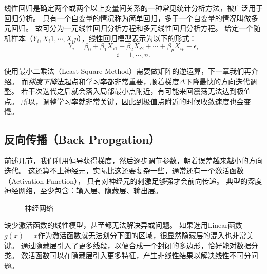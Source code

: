 线性回归是确定两个或两个以上变量间关系的一种常见统计分析方法，被广泛用于回归分析。
只有一个自变量的情况称为简单回归，多于一个自变量的情况叫做多元回归。
故可分为一元线性回归分析方程和多元线性回归分析方程。
给定一个随机样本（$Y_i, X_i1, \cdots, X_ip$），线性回归模型表示为以下的形式：
$$Y_i = \beta_0+\beta_1X_{i1}+\beta_2X_{i2}+\cdots+\beta_pX_{ip}+\epsilon_i$$
$$i=1,\cdots,n.$$

使用最小二乘法（Least Square Method）需要做矩阵的逆运算，下一章我们再介绍。
而\emph{梯度下降}法起点和学习率都非常重要，顺着梯度$\Delta$下降最快的方向迭代调整。
若干次迭代之后就会落入局部最小点附近，有可能来回震荡无法达到极值点。
所以，调整学习率就非常关键，因此到极值点附近的时候收敛速度也会变慢。

\subsection{反向传播（Back Propgation）}
前述几节，我们利用偏导获得梯度，然后逐步调节参数，朝着误差越来越小的方向迭代。
这还算不上神经元，实际比这还要复杂一些，通常还有一个激活函数（Activation Function），
只有对神经元的刺激足够强才会前向传递。
典型的深度神经网络，至少包含：输入层、隐藏层、输出层。

\begin{figure}[!htb] \centering 
	\caption{神经网络}
	\label{fig:part2_math_neural_node}
\end{figure}

缺少激活函数的线性模型，甚至都无法解决异或问题。
如果选用Linear函数$g(x)=x$作为激活函数就无法划分下图的区域，很显然隐藏层的混入也非常关键。
通过隐藏层引入了更多线段，以便合成一个封闭的多边形，恰好能对数据分类。
激活函数可以在隐藏层引入更多特征，产生非线性结果以解决线性不可分问题。

